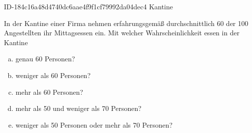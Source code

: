 \begin{exercise}
      {ID-184c16a48d4740dc6aae4f9f1cf79992da04dec4}
      {Kantine}
  \ifproblem\problem\par
    In der Kantine einer Firma nehmen erfahrungsgemäß durchschnittlich 60
    der 100 Angestellten ihr Mittagsessen ein. Mit welcher Wahrscheinlichkeit
    essen in der Kantine
    \begin{enumerate}[a)]
      \item genau 60 Personen?
      \item weniger als 60 Personen?
      \item mehr als 60 Personen?
      \item mehr als 50 und weniger als 70 Personen?
      \item weniger als 50 Personen oder mehr als 70 Personen?
    \end{enumerate}
  \fi
\end{exercise}
